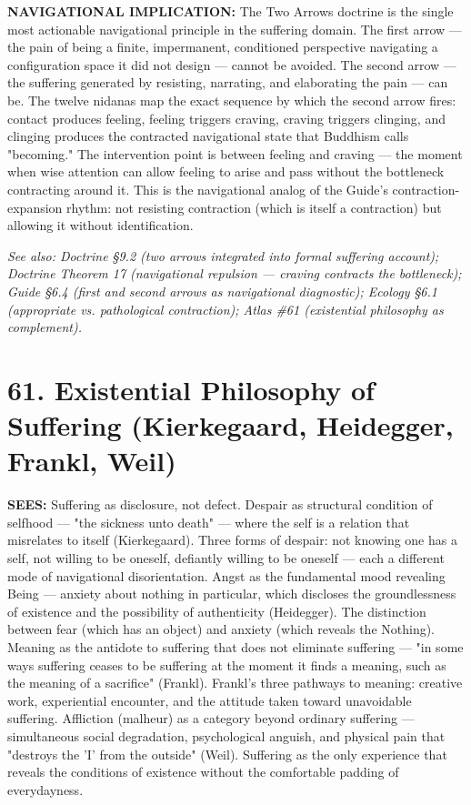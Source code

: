 \textbf{NAVIGATIONAL IMPLICATION:} The Two Arrows doctrine is the single most actionable navigational principle in the suffering domain. The first arrow — the pain of being a finite, impermanent, conditioned perspective navigating a configuration space it did not design — cannot be avoided. The second arrow — the suffering generated by resisting, narrating, and elaborating the pain — can be. The twelve nidanas map the exact sequence by which the second arrow fires: contact produces feeling, feeling triggers craving, craving triggers clinging, and clinging produces the contracted navigational state that Buddhism calls "becoming." The intervention point is between feeling and craving — the moment when wise attention can allow feeling to arise and pass without the bottleneck contracting around it. This is the navigational analog of the Guide's contraction-expansion rhythm: not resisting contraction (which is itself a contraction) but allowing it without identification.


\textit{See also: Doctrine §9.2 (two arrows integrated into formal suffering account); Doctrine Theorem 17 (navigational repulsion — craving contracts the bottleneck); Guide §6.4 (first and second arrows as navigational diagnostic); Ecology §6.1 (appropriate vs. pathological contraction); Atlas \#61 (existential philosophy as complement).}


\bigskip\noindent\makebox[\textwidth]{\color{rulegray}\rule{5cm}{0.3pt}}\bigskip


\section*{61. Existential Philosophy of Suffering (Kierkegaard, Heidegger, Frankl, Weil)}


\textbf{SEES:} Suffering as disclosure, not defect. Despair as structural condition of selfhood — "the sickness unto death" — where the self is a relation that misrelates to itself (Kierkegaard). Three forms of despair: not knowing one has a self, not willing to be oneself, defiantly willing to be oneself — each a different mode of navigational disorientation. Angst as the fundamental mood revealing Being — anxiety about nothing in particular, which discloses the groundlessness of existence and the possibility of authenticity (Heidegger). The distinction between fear (which has an object) and anxiety (which reveals the Nothing). Meaning as the antidote to suffering that does not eliminate suffering — "in some ways suffering ceases to be suffering at the moment it finds a meaning, such as the meaning of a sacrifice" (Frankl). Frankl's three pathways to meaning: creative work, experiential encounter, and the attitude taken toward unavoidable suffering. Affliction (malheur) as a category beyond ordinary suffering — simultaneous social degradation, psychological anguish, and physical pain that "destroys the 'I' from the outside" (Weil). Suffering as the only experience that reveals the conditions of existence without the comfortable padding of everydayness.


